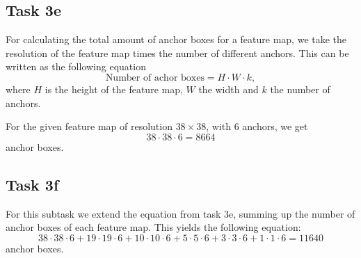 \subsection*{Task 3e}
For calculating the total amount of anchor boxes for a feature map, we take the resolution of the feature map times the number of different anchors.
This can be written as the following equation
\begin{equation*}
    \text{Number of achor boxes} = H \cdot W \cdot k,
\end{equation*}
where $H$ is the height of the feature map, $W$ the width and $k$ the number of anchors.

For the given feature map of resolution $38 \times 38$, with $6$ anchors, we get
\begin{equation*}
    38 \cdot 38 \cdot 6 = 8664
\end{equation*}
anchor boxes.


\subsection*{Task 3f}
For this subtask we extend the equation from task 3e, summing up the number of anchor boxes of each feature map. 
This yields the following equation:
\begin{equation*}
    38 \cdot 38 \cdot 6+19 \cdot 19 \cdot 6+10 \cdot 10 \cdot 6+5 \cdot 5 \cdot 6+3 \cdot 3 \cdot 6+1 \cdot 1 \cdot 6 = 11640
\end{equation*}
anchor boxes.





